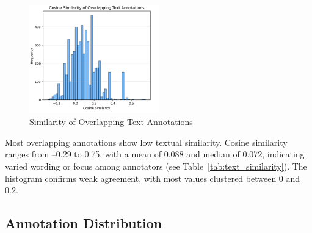 \documentclass{article}
\begin{document}
\begin{figure}[H]
  \centering
  \begin{minipage}{0.4\textwidth}
    \centering
    \begin{table}[H]
      \caption{Similarity of Overlapping Text Annotations Stats}
      \label{tab:text_similarity_1}
    \end{table}
  \end{minipage} \hfill
  \begin{minipage}{0.4\textwidth}
    \centering
    \includegraphics[width=0.5\textwidth]{figures/annotation_quality/similarity_of_overlapping_text_annotations.png}
    \caption{Similarity of Overlapping Text Annotations}
    \label{fig:text_similarity_2}
  \end{minipage}
\end{figure}

Most overlapping annotations show low textual similarity. Cosine similarity ranges from –0.29 to 0.75, with a mean of 0.088 and median of 0.072, indicating varied wording or focus among annotators (see Table~\ref{tab:text_similarity}). The histogram confirms weak agreement, with most values clustered between 0 and 0.2.

\subsection{Annotation Distribution}
\end{document}
